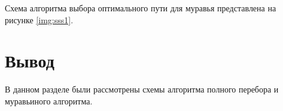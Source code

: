 
\newpage

Схема алгоритма выбора оптимального пути для муравья представлена на рисунке \ref{img:sss1}.


\newpage

\section{Вывод}

В данном разделе были рассмотрены схемы алгоритма полного перебора и муравьиного алгоритма.